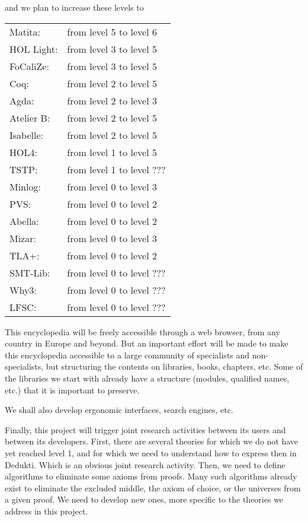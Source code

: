 and we plan to increase these levels to 

\begin{tabular}{ll}
Matita:& from level 5 to level 6\\
HOL Light:& from level 3 to level 5\\
FoCaliZe:& from level 3 to level 5\\
Coq:& from level 2 to level 5\\
Agda:& from level 2 to level 3\\
Atelier B:& from level 2 to level 5\\
Isabelle:& from level 2 to level 5\\
HOL4:& from level 1 to level 5\\
TSTP:& from level 1 to level ???\\
Minlog:& from level 0 to level 3\\
PVS:& from level 0 to level 2\\
Abella:& from level 0 to level 2\\
Mizar:& from level 0 to level 3\\
TLA+:& from level 0 to level 2\\
SMT-Lib:& from level 0 to level ???\\
Why3:& from level 0 to level ???\\
LFSC:& from level 0 to level ???\\

\end{tabular}

This encyclopedia will be freely accessible through a web browser,
from any country in Europe and beyond. But an important effort will be
made to make this encyclopedia accessible to a large community of
specialists and non-specialists, but structuring the contents on
libraries, books, chapters, etc. Some of the libraries we start with
already have a structure (modules, qualified names, etc.) that it is
important to preserve.

We shall also develop ergonomic interfaces, search engines, etc. 


Finally, this project will trigger joint research activities between
its users and between its developers.  First, there are several
theories for which we do not have yet reached level 1, and for which
we need to understand how to express then in {\sc Dedukti}. Which is
an obvious joint research activity. Then, we need to define algorithms
to eliminate some axioms from proofs. Many such algorithms already
exist to eliminate the excluded middle, the axiom of choice, or the universes
from a given proof. We need to develop new ones, more specific to the theories
we address in this project.

